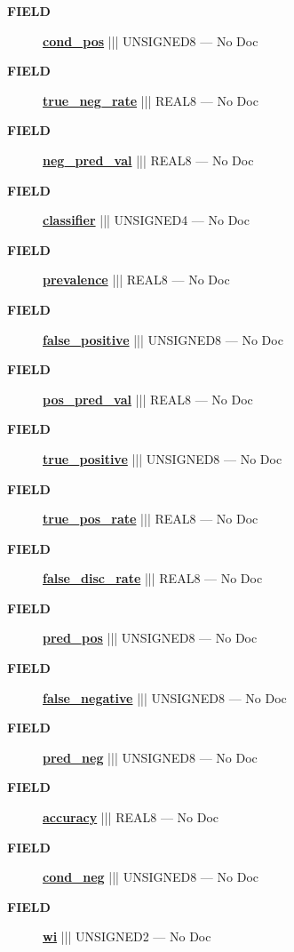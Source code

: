 \par
\begin{description}
\item [\colorbox{tagtype}{\color{white} \textbf{\textsf{FIELD}}}] \textbf{\underline{cond\_pos}} ||| UNSIGNED8 --- No Doc
\item [\colorbox{tagtype}{\color{white} \textbf{\textsf{FIELD}}}] \textbf{\underline{true\_neg\_rate}} ||| REAL8 --- No Doc
\item [\colorbox{tagtype}{\color{white} \textbf{\textsf{FIELD}}}] \textbf{\underline{neg\_pred\_val}} ||| REAL8 --- No Doc
\item [\colorbox{tagtype}{\color{white} \textbf{\textsf{FIELD}}}] \textbf{\underline{classifier}} ||| UNSIGNED4 --- No Doc
\item [\colorbox{tagtype}{\color{white} \textbf{\textsf{FIELD}}}] \textbf{\underline{prevalence}} ||| REAL8 --- No Doc
\item [\colorbox{tagtype}{\color{white} \textbf{\textsf{FIELD}}}] \textbf{\underline{false\_positive}} ||| UNSIGNED8 --- No Doc
\item [\colorbox{tagtype}{\color{white} \textbf{\textsf{FIELD}}}] \textbf{\underline{pos\_pred\_val}} ||| REAL8 --- No Doc
\item [\colorbox{tagtype}{\color{white} \textbf{\textsf{FIELD}}}] \textbf{\underline{true\_positive}} ||| UNSIGNED8 --- No Doc
\item [\colorbox{tagtype}{\color{white} \textbf{\textsf{FIELD}}}] \textbf{\underline{true\_pos\_rate}} ||| REAL8 --- No Doc
\item [\colorbox{tagtype}{\color{white} \textbf{\textsf{FIELD}}}] \textbf{\underline{false\_disc\_rate}} ||| REAL8 --- No Doc
\item [\colorbox{tagtype}{\color{white} \textbf{\textsf{FIELD}}}] \textbf{\underline{pred\_pos}} ||| UNSIGNED8 --- No Doc
\item [\colorbox{tagtype}{\color{white} \textbf{\textsf{FIELD}}}] \textbf{\underline{false\_negative}} ||| UNSIGNED8 --- No Doc
\item [\colorbox{tagtype}{\color{white} \textbf{\textsf{FIELD}}}] \textbf{\underline{pred\_neg}} ||| UNSIGNED8 --- No Doc
\item [\colorbox{tagtype}{\color{white} \textbf{\textsf{FIELD}}}] \textbf{\underline{accuracy}} ||| REAL8 --- No Doc
\item [\colorbox{tagtype}{\color{white} \textbf{\textsf{FIELD}}}] \textbf{\underline{cond\_neg}} ||| UNSIGNED8 --- No Doc
\item [\colorbox{tagtype}{\color{white} \textbf{\textsf{FIELD}}}] \textbf{\underline{wi}} ||| UNSIGNED2 --- No Doc

\end{description}
